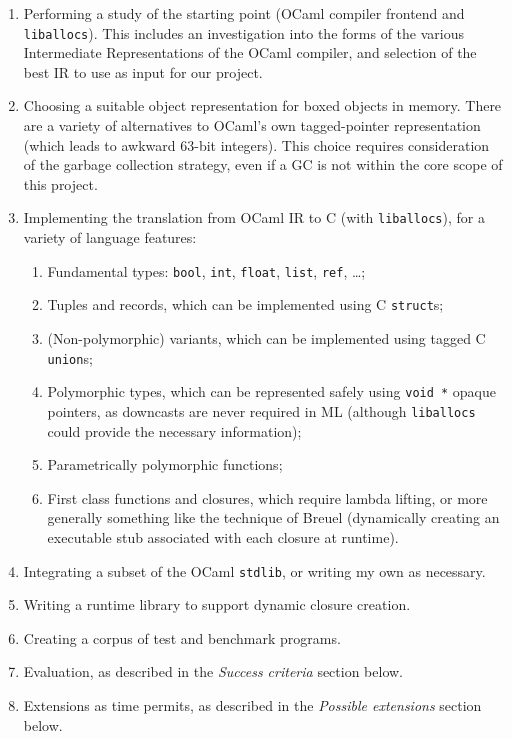 \documentclass[12pt,twoside,a4paper]{article}
\begin{document}
\begin{enumerate}
  \item
    Performing a study of the starting point (OCaml compiler frontend and \lstinline{liballocs}).
    This includes an investigation into the forms of the various Intermediate Representations of the OCaml compiler, and selection of the best IR to use as input for our project.
  \item
    Choosing a suitable object representation for boxed objects in memory. There are a variety of alternatives to OCaml's own tagged-pointer representation (which leads to awkward 63-bit integers).
    This choice requires consideration of the garbage collection strategy, even if a GC is not within the core scope of this project.
  \item
    Implementing the translation from OCaml IR to C (with \lstinline{liballocs}), for a variety of language features:
    \begin{enumerate}
      \item Fundamental types: \lstinline{bool}, \lstinline{int}, \lstinline{float}, \lstinline{list}, \lstinline{ref}, \ldots;
      \item Tuples and records, which can be implemented using C \lstinline{struct}s;
      \item (Non-polymorphic) variants, which can be implemented using tagged C \lstinline{union}s;
      \item Polymorphic types, which can be represented safely using \lstinline{void *}
        opaque pointers, as downcasts are never required
        in ML (although \lstinline{liballocs} could provide the necessary information);
      \item Parametrically polymorphic functions;
      \item First class functions and closures, which require lambda lifting,
        or more generally something like the technique of Breuel
        \cite{breuel88} (dynamically creating an executable stub associated
        with each closure at runtime).
    \end{enumerate}
  \item
    Integrating a subset of the OCaml \lstinline{stdlib}, or writing my own as necessary.
  \item
    Writing a runtime library to support dynamic closure creation.
  \item
    Creating a corpus of test and benchmark programs.
  \item
    Evaluation, as described in the \textit{Success criteria} section below.
  \item
    Extensions as time permits, as described in the \textit{Possible extensions} section below.
\end{enumerate}
\end{document}
